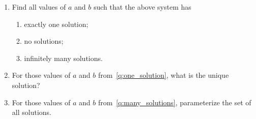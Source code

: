\documentclass{article}
\begin{document}
\begin{enumerate}
\begin{enumerate}
\item Find all values of $a$ and $b$ such that the above system has
\begin{enumerate}
\item \label{q:one_solution} exactly one solution;
\item no solutions;
\item \label{q:many_solutions} infinitely many solutions.
\end{enumerate}
\item For those values of $a$ and $b$ from~\ref{q:one_solution}, what is the
unique solution?
\item For those values of $a$ and $b$ from~\ref{q:many_solutions},
 parameterize the set of all solutions.
\end{enumerate}



\end{enumerate}
\end{document}
